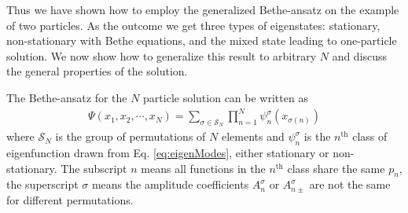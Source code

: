 \documentclass[aps,showpacs,twocolumn,floatfix,prx,superscriptaddress]{revtex4-1}
\begin{document}
Thus we have shown how to employ the generalized Bethe-ansatz on the example of two particles. As the outcome we get three types of eigenstates: stationary, non-stationary with Bethe equations, and the mixed state leading to one-particle solution. We now show how to generalize this result to arbitrary $N$ and discuss the general properties of the solution.  %


The Bethe-ansatz for the $N$ particle solution can be written as
\begin{equation}
    \label{eq:ansatzN}
    \begin{aligned}
        \Psi(x_1, x_2, \cdots, x_N) = \sum_{\sigma\in \mathcal{S}_N}
        \prod_{n=1}^N \psi_n^{\sigma}(x_{\sigma(n)})
    \end{aligned}
\end{equation}
where $\mathcal{S}_N$ is the group of permutations of $N$ elements and $\psi_n^{\sigma}$ is the $n^{\text{th}}$ class of eigenfunction drawn from Eq.  \eqref{eq:eigenModes}, either stationary or non-stationary. The subscript $n$ means all functions in the $n^{\text{th}}$ class share the same $p_n$, the superscript $\sigma$ means the amplitude coefficients $A_n^{\sigma}$ or $A_{n\pm}^{\sigma}$ are not the same for different permutations.
\end{document}
